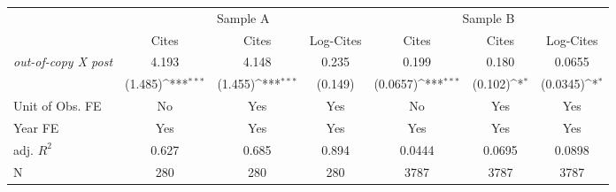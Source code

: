 {
\def\sym#1{\ifmmode^{#1}\else\(^{#1}\)\fi}
\begin{tabular*}{\hsize}{@{\hskip\tabcolsep\extracolsep\fill}l*{6}{c}}
\toprule
            &\multicolumn{3}{c}{Sample A}                                     &\multicolumn{3}{c}{Sample B}                                     \\\cmidrule(lr){2-4}\cmidrule(lr){5-7}
            &\multicolumn{1}{c}{Cites}&\multicolumn{1}{c}{Cites}&\multicolumn{1}{c}{Log-Cites}&\multicolumn{1}{c}{Cites}&\multicolumn{1}{c}{Cites}&\multicolumn{1}{c}{Log-Cites}\\
\midrule
\emph{out-of-copy X post}&       4.193         &       4.148         &       0.235         &       0.199         &       0.180         &      0.0655         \\
            &     (1.485)\sym{***}&     (1.455)\sym{***}&     (0.149)         &    (0.0657)\sym{***}&     (0.102)\sym{*}  &    (0.0345)\sym{*}  \\
\midrule
Unit of Obs. FE&          No         &         Yes         &         Yes         &          No         &         Yes         &         Yes         \\
Year FE     &         Yes         &         Yes         &         Yes         &         Yes         &         Yes         &         Yes         \\
adj. $R^2$  &       0.627         &       0.685         &       0.894         &      0.0444         &      0.0695         &      0.0898         \\
N           &         280         &         280         &         280         &        3787         &        3787         &        3787         \\
\bottomrule
\end{tabular*}
}
